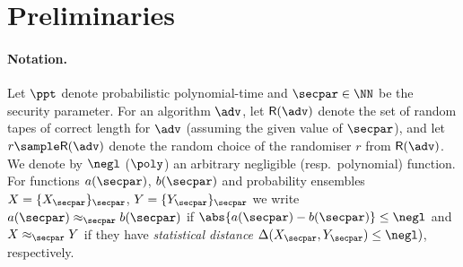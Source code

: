 \section{Preliminaries}
\label{sec:preliminaries}


\paragraph{Notation.} Let $\ppt$ denote probabilistic polynomial-time and $\secpar \in \NN$ be the
security parameter. %
For an algorithm $\adv$, 
let
$\RND{\adv}$ denote the set of random tapes of correct length for $\adv$
(assuming the given value of $\secpar$), and let $r \sample \RND{\adv}$ denote
the random choice of the randomiser $r$ from $\RND{\adv}$. We denote by $\negl$
($\poly$) an arbitrary negligible (resp.~polynomial) function.
%
For functions $a(\secpar)$, $b(\secpar)$ and probability ensembles $X = \smallset{X_\secpar}_\secpar$,
$Y = \smallset{Y_\secpar}_\secpar$ we
write $a(\secpar) \approx_\secpar b(\secpar)$ if
$\abs{a(\secpar) - b(\secpar)} \leq \negl$ and $X \approx_\secpar Y$ if they have \emph{statistical distance} $\SD(X_\secpar, Y_\secpar) \leq \negl )$, respectively. \medskip



